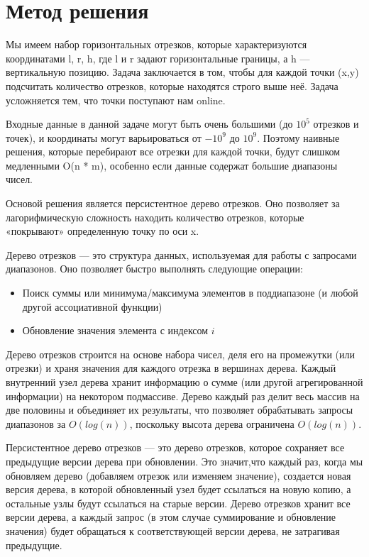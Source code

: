 \documentclass[12pt]{article}
\begin{document}
\newpage
\section*{Метод решения}

Мы имеем набор горизонтальных отрезков, которые характеризуются координатами 
l, r, h, где l и r задают горизонтальные границы, а h — вертикальную позицию. Задача заключается в том, чтобы для каждой точки (x,y) подсчитать количество отрезков, которые находятся строго выше неё. Задача усложняется тем, что точки поступают нам online.

Входные данные в данной задаче могут быть очень большими (до $10^5$ отрезков и точек), и координаты могут варьироваться от $-10^9$ до $10^9$. Поэтому наивные решения, которые перебирают все отрезки для каждой точки, будут слишком медленными O(n * m), особенно если данные содержат большие диапазоны чисел.

Основой решения является персистентное дерево отрезков. Оно позволяет за лагорифмическую сложность находить количество отрезков, которые «покрывают» определенную точку по оси x. 

Дерево отрезков — это структура данных, используемая для работы с запросами диапазонов. Оно позволяет быстро выполнять следующие операции:

\begin{itemize}
    \item Поиск суммы или минимума/максимума элементов в поддиапазоне (и любой другой ассоциативной функции)
    \item Обновление значения элемента с индексом $i$
\end{itemize}

Дерево отрезков строится на основе набора чисел, деля его на промежутки (или отрезки) и храня значения для каждого отрезка в вершинах дерева. Каждый внутренний узел дерева хранит информацию о сумме (или другой агрегированной информации) на некотором подмассиве. Дерево каждый раз делит весь массив на две половины и объединяет их результаты, что позволяет обрабатывать запросы диапазонов за $O(log(n))$, поскольку высота дерева ограничена $O(log(n))$.

Персистентное дерево отрезков — это дерево отрезков, которое сохраняет все предыдущие версии дерева при обновлении. Это значит,что каждый раз, когда мы обновляем дерево (добавляем отрезок или изменяем значение), создается новая версия дерева, в которой обновленный узел будет ссылаться на новую копию, а остальные узлы будут ссылаться на старые версии. Дерево отрезков хранит все версии дерева, а каждый запрос (в этом случае суммирование и обновление значения) будет обращаться к соответствующей версии дерева, не затрагивая предыдущие.
\end{document}

